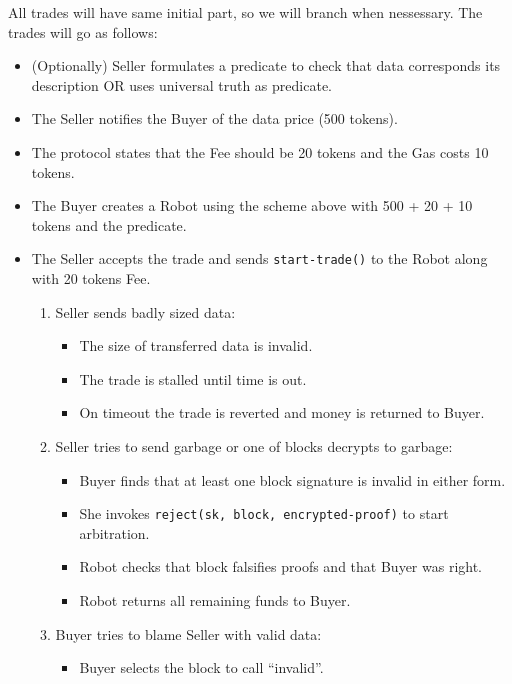 All trades will have same initial part, so we will branch when nessessary.
The trades will go as follows:
\begin{itemize}
  \item (Optionally) Seller formulates a predicate to check that data corresponds its description OR uses universal truth as predicate.

  \item The Seller notifies the Buyer of the data price (500 tokens).
  \item The protocol states that the Fee should be 20 tokens and the Gas costs 10 tokens.
  \item The Buyer creates a Robot using the scheme above with 500 + 20 + 10 tokens and the predicate.

  \item The Seller accepts the trade and sends \verb|start-trade()| to the Robot along with 20 tokens Fee.

  \begin{enumerate}
    \item Seller sends badly sized data:
      \begin{itemize}
        \item The size of transferred data is invalid.
        \item The trade is stalled until time is out.
        \item On timeout the trade is reverted and money is returned to Buyer.
      \end{itemize}
    \item Seller tries to send garbage or one of blocks decrypts to garbage:
      \begin{itemize}
        \item Buyer finds that at least one block signature is invalid in either form.

        \item She invokes \verb|reject(sk, block, encrypted-proof)| to start arbitration.

        \item Robot checks that block falsifies proofs and that Buyer was right.

        \item Robot returns all remaining funds to Buyer.
      \end{itemize}
    \item Buyer tries to blame Seller with valid data:
      \begin{itemize}
        \item Buyer selects the block to call ``invalid''.


\end{itemize}
\end{enumerate}
\end{itemize}
